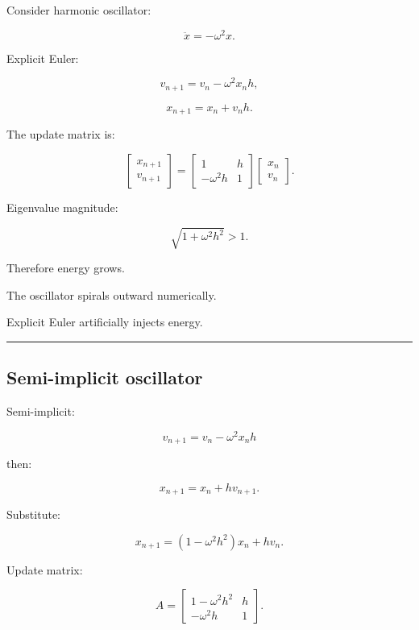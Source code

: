 \hypertarget{06-engine-ii-ch037-part-1664-why-games-prefer-semi-implicit-euler}{}

Consider harmonic oscillator:

\[
\ddot x
=
-\omega^2x.
\]

Explicit Euler:

\[
v_{n+1}
=
v_n-\omega^2x_nh,
\]

\[
x_{n+1}
=
x_n+v_nh.
\]

The update matrix is:

\[
\begin{bmatrix}
x_{n+1}\\v_{n+1}
\end{bmatrix}
=
\begin{bmatrix}
1&h\\
-\omega^2h&1
\end{bmatrix}
\begin{bmatrix}
x_n\\v_n
\end{bmatrix}.
\]

Eigenvalue magnitude:

\[
\sqrt{1+\omega^2h^2}>1.
\]

Therefore energy grows.

The oscillator spirals outward numerically.

Explicit Euler artificially injects energy.

\begin{center}\rule{0.5\linewidth}{0.5pt}\end{center}

\subsection{Semi-implicit oscillator}\label{06-engine-ii-ch037-semi-implicit-oscillator}

\hypertarget{06-engine-ii-ch037-semi-implicit-oscillator}{}

Semi-implicit:

\[
v_{n+1}
=
v_n-\omega^2x_nh
\]

then:

\[
x_{n+1}
=
x_n+h v_{n+1}.
\]

Substitute:

\[
x_{n+1}
=
(1-\omega^2h^2)x_n+
hv_n.
\]

Update matrix:

\[
A=
\begin{bmatrix}
1-\omega^2h^2&h\\
-\omega^2h&1
\end{bmatrix}.
\]

